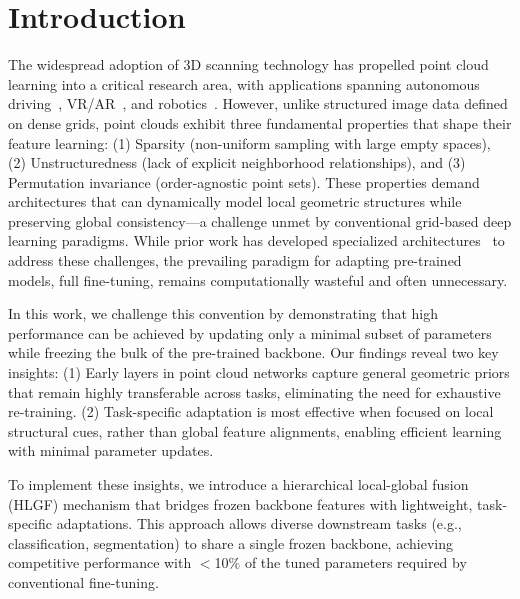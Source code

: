 \section{Introduction}
\label{sec:intro}


The widespread adoption of 3D scanning technology has propelled point cloud learning into a critical research area, with applications spanning autonomous driving~\cite{yang2024visual,song2024graphbev,chen20203d}, VR/AR~\cite{casado2023rendering,garrido2021point}, and robotics~\cite{wang2021trajectory,chen2022direct,christen2023learning}. However, unlike structured image data defined on dense grids, point clouds exhibit three fundamental properties that shape their feature learning: (1) Sparsity (non-uniform sampling with large empty spaces), (2) Unstructuredness (lack of explicit neighborhood relationships), and (3) Permutation invariance (order-agnostic point sets). These properties demand architectures that can dynamically model local geometric structures while preserving global consistency—a challenge unmet by conventional grid-based deep learning paradigms. While prior work has developed specialized architectures~\cite{qi2017pointnet, li2018pointcnn, qian2022pointnext, qi2017pointnet++, wang2019dynamic, wu2024point} to address these challenges, the prevailing paradigm for adapting pre-trained models, full fine-tuning, remains computationally wasteful and often unnecessary.

In this work, we challenge this convention by demonstrating that high performance can be achieved by updating only a minimal subset of parameters while freezing the bulk of the pre-trained backbone. Our findings reveal two key insights:
(1) Early layers in point cloud networks capture general geometric priors that remain highly transferable across tasks, eliminating the need for exhaustive re-training.
(2) Task-specific adaptation is most effective when focused on local structural cues, rather than global feature alignments, enabling efficient learning with minimal parameter updates.

To implement these insights, we introduce a hierarchical local-global fusion (HLGF) mechanism that bridges frozen backbone features with lightweight, task-specific adaptations. This approach allows diverse downstream tasks (e.g., classification, segmentation) to share a single frozen backbone, achieving competitive performance with $<$10$\%$ of the tuned parameters required by conventional fine-tuning.


